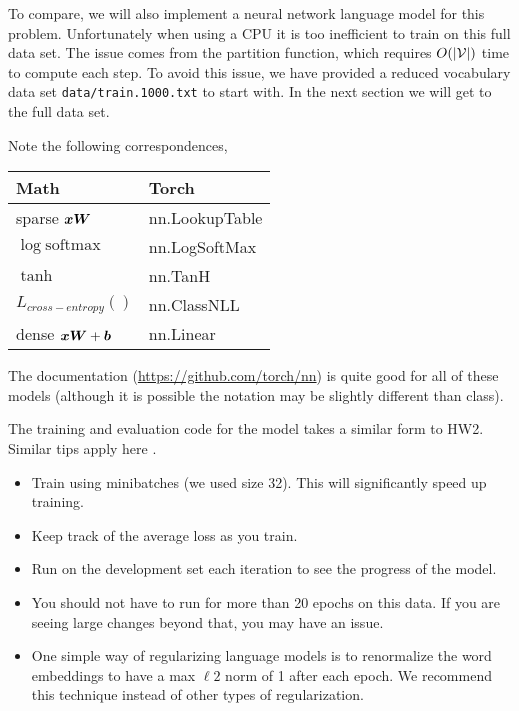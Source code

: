 \documentclass[11pt]{article}
\begin{document}
To compare, we will also implement a neural network language model for
this problem. Unfortunately when using a CPU it is too inefficient to
train on this full data set. The issue comes from the partition
function, which requires $O(|\mathcal{V}|)$ time to compute each step. To
avoid this issue, we have provided a reduced vocabulary data set
\texttt{data/train.1000.txt} to start with. In the next section we 
will get to the full data set.

Note the following correspondences,

\begin{center}
  \begin{tabular}{ll}
    \toprule
    Math & Torch \\
    \midrule 
    sparse $\boldsymbol{x} \boldsymbol{W}$ & nn.LookupTable \\ 
    $\log \mathrm{softmax}$ & nn.LogSoftMax \\ 
    $\tanh $ & nn.TanH \\ 
    $L_{cross-entropy}()$ & nn.ClassNLL \\ 
    dense $\boldsymbol{x} \boldsymbol{W} + \boldsymbol{b}$ & nn.Linear \\ 
    \bottomrule
  \end{tabular}
\end{center}
The documentation (\url{https://github.com/torch/nn}) is quite good
for all of these models (although it is possible the notation may be
slightly different than class).

The training and evaluation code for the model takes a similar form to
HW2. Similar tips apply here .
 
 \begin{itemize}
 \item Train using minibatches (we used size 32). This will significantly speed up training. 
 \item Keep track of the average loss as you train. 
 \item Run on the development set each iteration to see the progress of the model.
 \item You should not have to run for more than 20 epochs on this data. If you are seeing large 
   changes beyond that, you may have an issue. 
 \item One simple way of regularizing language models is to
   renormalize the word embeddings to have a max $\ell2$ norm of 1
   after each epoch. We recommend this technique instead of other
   types of regularization.
 \end{itemize}
\end{document}
